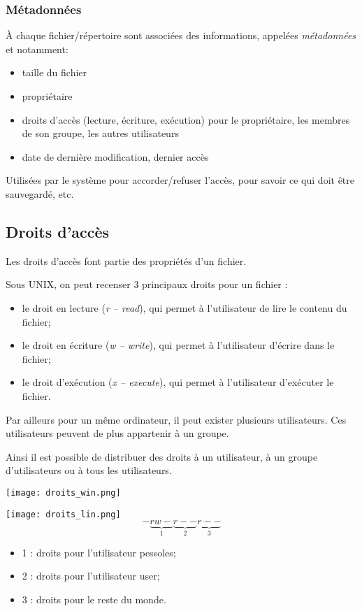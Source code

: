 \subsubsection{Métadonnées}
À chaque fichier/répertoire sont associées des informations, appelées
\emph{métadonnées} et notamment:
\begin{itemize}
\item taille du fichier
\item propriétaire
\item droits d'accès (lecture, écriture, exécution) pour le
  propriétaire, les membres de son groupe, les autres utilisateurs
\item date de dernière modification, dernier accès
\end{itemize}
Utilisées par le système pour accorder/refuser l'accès, pour savoir ce
qui doit être sauvegardé, etc.

\subsection{Droits d’accès}

Les droits d'accès font partie des propriétés d'un fichier. 

Sous UNIX, on peut recenser 3 principaux droits pour un fichier : 
\begin{itemize}
\item le droit en lecture (\textit{r -- read}), qui permet à l'utilisateur de lire le contenu du fichier;
\item le droit en écriture (\textit{w -- write}), qui permet à l'utilisateur d'écrire dans le fichier;
\item le droit d'exécution (\textit{x -- execute}), qui permet à l'utilisateur d'exécuter le fichier.
\end{itemize}

Par ailleurs pour un même ordinateur, il peut exister plusieurs utilisateurs. Ces utilisateurs peuvent de plus appartenir à un groupe.

Ainsi il est possible de distribuer des droits à un utilisateur, à un groupe d'utilisateurs ou à tous les utilisateurs.  

\begin{minipage}[c]{.45\linewidth}
\begin{center}
\texttt{[image: droits\_win.png]}
\end{center}
\end{minipage}\hfill
\begin{minipage}[c]{.45\linewidth}
\begin{center}
\texttt{[image: droits\_lin.png]}
$$
-\underbrace{rw-}_{1}\underbrace{r--}_{2}\underbrace{r--}_{3}
$$
\begin{itemize}
\item 1 : droits pour l'utilisateur pessoles;
\item 2 : droits pour l'utilisateur user;
\item 3 : droits pour le reste du monde.
\end{itemize}
\end{center}
\end{minipage}


